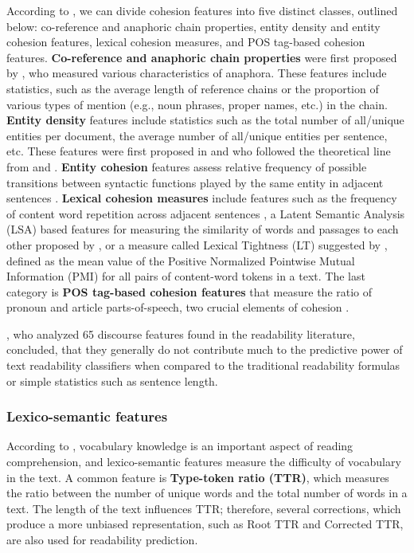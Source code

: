 \documentclass{clv3}
\begin{document}
According to \citet{todirascu-etal-2016-cohesive}, we can divide cohesion features into five distinct classes, outlined below: co-reference and anaphoric chain properties, entity density and entity cohesion features, lexical cohesion measures, and POS tag-based cohesion features.
\textbf{Co-reference and anaphoric chain properties} were first proposed by \citet{bormuth1969development}, who measured various characteristics of anaphora. These features include statistics, such as the average length of reference chains or the proportion of various types of mention (e.g., noun phrases, proper names, etc.) in the chain. \textbf{Entity density} features include statistics such as the total number of all/unique entities per document, the average number of all/unique entities per sentence, etc. These features were first proposed in \citet{feng2009cognitively} and \citet{feng2010comparison} who followed the theoretical line from \citet{halliday1976cohesion} and \citet{williams2006michael}. \textbf{Entity cohesion} features assess relative frequency of possible transitions between syntactic functions played by the same entity in adjacent sentences \citep{pitler2008revisiting}. \textbf{Lexical cohesion measures} include features such as the frequency of content word repetition across adjacent sentences \citep{sheehan2014textevaluator}, a Latent Semantic Analysis (LSA) based features for measuring the similarity of words and passages to each other proposed by \citet{landauer2011pearson}, or a measure called Lexical Tightness (LT) suggested by \citet{flor2013lexical}, defined as the mean value of the Positive Normalized Pointwise Mutual Information (PMI) for all pairs of content-word tokens in a text. The last category is \textbf{POS tag-based cohesion features} that measure the ratio of pronoun and article parts-of-speech, two crucial elements of cohesion \citep{todirascu-etal-2016-cohesive}.

\citet{todirascu-etal-2016-cohesive}, who analyzed 65 discourse features found in the readability literature, concluded, that they generally do not contribute much to the predictive power of text readability classifiers when compared to the traditional readability formulas or simple statistics such as sentence length. 

\subsubsection{Lexico-semantic features}

According to \citet{collins2014computational}, vocabulary knowledge is an important aspect of reading comprehension, and lexico-semantic features measure the difficulty of vocabulary in the text. A common feature is \textbf{Type-token ratio (TTR)}, which measures the ratio between the number of unique words and the total number of words in a text. The length of the text influences TTR; therefore, several corrections, which produce a more unbiased representation, such as Root TTR and Corrected TTR, are also used for readability prediction.
\end{document}
